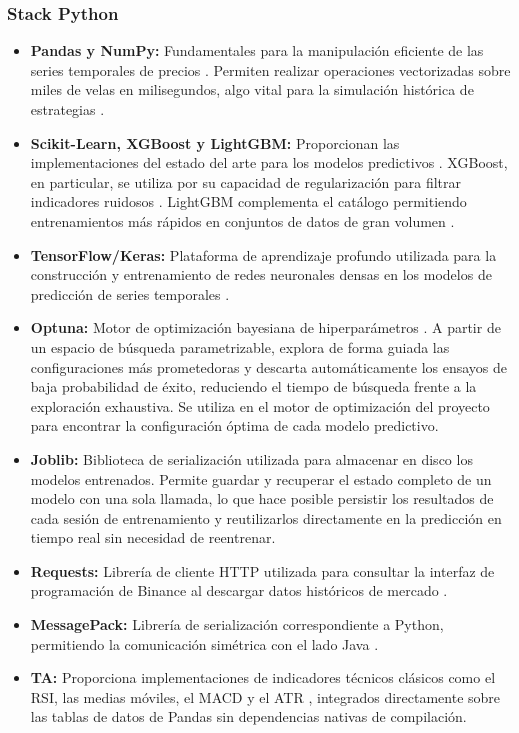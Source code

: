 \subsubsection{Stack Python}

\begin{itemize}
    \item \textbf{Pandas y NumPy:} Fundamentales para la manipulación eficiente de las series temporales de precios \parencite{mckinney_python_2022}. Permiten realizar operaciones vectorizadas sobre miles de velas en milisegundos, algo vital para la simulación histórica de estrategias \parencite{treleaven_algorithmic_2013}.
    \item \textbf{Scikit-Learn, XGBoost y LightGBM:} Proporcionan las implementaciones del estado del arte para los modelos predictivos \parencite{pedregosa_scikit_2011}. XGBoost, en particular, se utiliza por su capacidad de regularización para filtrar indicadores ruidosos \parencite{chen_xgboost_2016}. LightGBM complementa el catálogo permitiendo entrenamientos más rápidos en conjuntos de datos de gran volumen \parencite{ke_lightgbm_2017}.
    \item \textbf{TensorFlow/Keras:} Plataforma de aprendizaje profundo utilizada para la construcción y entrenamiento de redes neuronales densas en los modelos de predicción de series temporales \parencite{goodfellow_deep_2016}.
    \item \textbf{Optuna:} Motor de optimización bayesiana de hiperparámetros \parencite{feurer_hyperparameter_2019}. A partir de un espacio de búsqueda parametrizable, explora de forma guiada las configuraciones más prometedoras y descarta automáticamente los ensayos de baja probabilidad de éxito, reduciendo el tiempo de búsqueda frente a la exploración exhaustiva. Se utiliza en el motor de optimización del proyecto para encontrar la configuración óptima de cada modelo predictivo.
    \item \textbf{Joblib:} Biblioteca de serialización utilizada para almacenar en disco los modelos entrenados. Permite guardar y recuperar el estado completo de un modelo con una sola llamada, lo que hace posible persistir los resultados de cada sesión de entrenamiento y reutilizarlos directamente en la predicción en tiempo real sin necesidad de reentrenar.
    \item \textbf{Requests:} Librería de cliente HTTP utilizada para consultar la interfaz de programación de Binance al descargar datos históricos de mercado \parencite{binance_rest_api_2024,requests_python_2024}.
    \item \textbf{MessagePack:} Librería de serialización correspondiente a Python, permitiendo la comunicación simétrica con el lado Java \parencite{furuhashi_msgpack_2013}.
    \item \textbf{TA:} Proporciona implementaciones de indicadores técnicos clásicos como el RSI, las medias móviles, el MACD y el ATR \parencite{murphy_technical_1999}, integrados directamente sobre las tablas de datos de Pandas \parencite{mckinney_python_2022} sin dependencias nativas de compilación.

\end{itemize}

